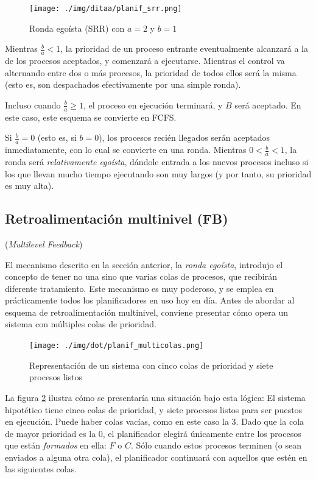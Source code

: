 \documentclass[11pt,fleqn]{book} %
\begin{document}
\begin{figure}[htb]
\centering
\texttt{[image: ./img/ditaa/planif\_srr.png]}
\caption{\label{PLAN_planif_srr}Ronda egoísta (SRR) con $a = 2$ y $b = 1$}
\end{figure}

Mientras $\frac{b}{a} < 1$, la prioridad de un proceso entrante
eventualmente alcanzará a la de los procesos aceptados, y comenzará a
ejecutarse. Mientras el control va alternando entre dos o más
procesos, la prioridad de todos ellos será la misma (esto es, son
despachados efectivamente por una simple ronda).

Incluso cuando $\frac{b}{a} \ge 1$, el proceso en ejecución terminará,
y $B$ será aceptado. En este caso, este esquema se convierte en FCFS.

Si $\frac{b}{a} = 0$ (esto es, si $b = 0$), los procesos recién
llegados serán aceptados inmediatamente, con lo cual se convierte en
una ronda. Mientras $0 < \frac{b}{a} < 1$, la ronda será
\emph{relativamente egoísta}, dándole entrada a los nuevos procesos
incluso si los que llevan mucho tiempo ejecutando son muy largos (y
por tanto, su prioridad es muy alta).
\subsection{Retroalimentación multinivel (FB)}
\label{sec-4-2-6}


(\emph{Multilevel Feedback})

El mecanismo descrito en la sección anterior, la \emph{ronda egoísta},
introdujo el concepto de tener no una sino que varias colas de
procesos, que recibirán diferente tratamiento. Este mecanismo es muy
poderoso, y se emplea en prácticamente todos los planificadores en uso
hoy en día. Antes de abordar al esquema de retroalimentación
multinivel, conviene presentar cómo opera un sistema con múltiples
colas de prioridad.

\begin{figure}[htb]
\centering
\texttt{[image: ./img/dot/planif\_multicolas.png]}
\caption{\label{PLAN_planif_multicolas}Representación de un sistema con cinco colas de prioridad y siete procesos listos}
\end{figure}

La figura \ref{PLAN_planif_multicolas} ilustra cómo se presentaría
una situación bajo esta lógica: El sistema hipotético tiene cinco
colas de prioridad, y siete procesos listos para ser puestos en
ejecución. Puede haber colas vacías, como en este caso la 3. Dado que
la cola de mayor prioridad es la 0, el planificador elegirá únicamente
entre los procesos que están \emph{formados} en ella: $F$ o $C$. Sólo
cuando estos procesos terminen (o sean enviados a alguna otra cola),
el planificador continuará con aquellos que estén en las siguientes
colas.
\end{document}
